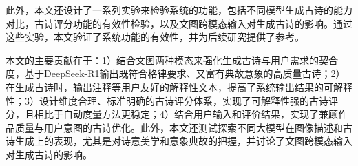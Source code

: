 


此外，本文还设计了一系列实验来检验系统的功能，包括不同模型生成古诗的能力对比，古诗评分功能的有效性检验，以及文图跨模态输入对生成古诗的影响。通过这些实验，本文验证了系统功能的有效性，并为后续研究提供了参考。

本文的主要贡献在于：1）结合文图两种模态来强化生成古诗与用户需求的契合度，基于DeepSeek-R1输出既符合格律要求、又富有典故意象的高质量古诗；2）在生成古诗时，输出注释等用户友好的解释性文本，提高了系统输出结果的可解释性；3）设计维度合理、标准明确的古诗评分体系，实现了可解释性强的古诗评分，且相比于自动度量方法更稳定；4）结合用户输入和评价结果，实现了兼顾作品质量与用户意图的古诗优化。此外，本文还测试探索不同大模型在图像描述和古诗生成上的表现，尤其是对诗意美学和意象典故的把握，并讨论了文图跨模态输入对生成古诗的影响。


